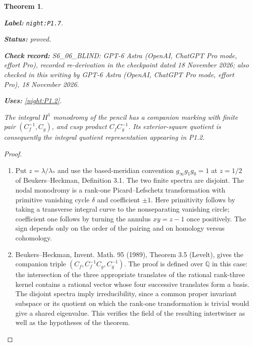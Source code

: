 \documentclass[11pt,a4paper]{article}
\newtheorem{theorem}{Theorem}[section]
\theoremstyle{definition}
\newcommand{\StatementRecord}[4]{\par\smallskip\begingroup\upshape\raggedright\noindent\textbf{Label:} \nolinkurl{#1}.\par\noindent\textbf{Status:} #2.\par\noindent\textbf{Check record:} #3.\par\noindent\textbf{Uses:} #4.\par\endgroup\smallskip}
\newcommand{\CurrentChecker}{GPT-6 Astra (OpenAI, ChatGPT Pro mode, effort Pro), 18 November 2026}
\begin{document}
\begin{theorem}\label{night:P1.7}
\StatementRecord{night:P1.7}{proved}{S6\_06\_BLIND: GPT-6 Astra (OpenAI, ChatGPT Pro mode, effort Pro), recorded re-derivation in the checkpoint dated 18 November 2026; also checked in this writing by \CurrentChecker}{\cref{night:P1.2}}
The integral $H^1$ monodromy of the pencil has a companion marking with
finite pair $(C_f^{-1},C_g)$, and cusp product $C_fC_g^{-1}$.
Its exterior-square quotient is consequently the integral quotient
representation appearing in P1.2.
\end{theorem}
\begin{proof}
\begin{enumerate}[label=\arabic*.]
\item Put $z=\lambda/\lambda_*$ and use the based-meridian convention
$g_\infty g_1g_0=1$ at $z=1/2$ of Beukers--Heckman,
Definition 3.1.  The two finite spectra are disjoint.  The nodal
monodromy is a rank-one Picard--Lefschetz transformation with primitive
vanishing cycle $\delta$ and coefficient $\pm1$.
Here primitivity follows by taking a transverse integral curve to the
nonseparating vanishing circle; coefficient one follows by turning the
annulus $xy=z-1$ once positively.  The sign depends only on the order
of the pairing and on homology versus cohomology.

\item Beukers--Heckman, Invent. Math. 95 (1989), Theorem 3.5 (Levelt), gives
the companion triple $(C_f,C_f^{-1}C_g,C_g^{-1})$.
The proof is defined over $\mathbb Q$ in this case: the intersection of
the three appropriate translates of the rational rank-three kernel
contains a rational vector whose four successive translates form a
basis.  The disjoint spectra imply irreducibility, since a common
proper invariant subspace or its quotient on which the rank-one
transformation is trivial would give a shared eigenvalue.  This
verifies the field of the resulting intertwiner as well as the
hypotheses of the theorem.


\end{enumerate}
\end{proof}
\end{document}
